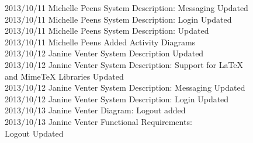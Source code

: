 \documentclass[29pt,a4paper]{moderncv}
\begin{document}
\begin{tabbing}
2013/10/11  \> Michelle Peens \> System Description: Messaging Updated\\
2013/10/11  \> Michelle Peens \> System Description: Login Updated\\
2013/10/11  \> Michelle Peens \> System Description: Updated\\
2013/10/11  \> Michelle Peens \> Added Activity Diagrams\\
2013/10/12  \> Janine Venter \> System Description Updated\\
2013/10/12  \> Janine Venter \> System Description: Support for LaTeX \\ \> \> \> and MimeTeX Libraries Updated\\
2013/10/12  \> Janine Venter \> System Description: Messaging Updated\\
2013/10/12  \> Janine Venter \> System Description: Login Updated\\
2013/10/13  \> Janine Venter \> Diagram: Logout added\\
2013/10/13  \> Janine Venter \> Functional Requirements: \\ \> \> \> Logout Updated\\


\end{tabbing}


\newpage
\end{document}
